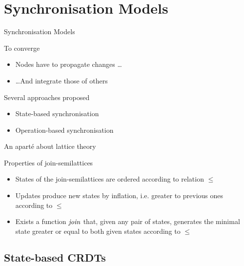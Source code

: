 \section{Synchronisation Models}

\begin{frame}{Synchronisation Models}
    \begin{block}{To converge}
        \begin{itemize}
            \item Nodes have to propagate changes \dots
            \item \dots And integrate those of others
        \end{itemize}
    \end{block}

    \begin{block}{Several approaches proposed}
        \begin{itemize}
            \item State-based synchronisation
            \item Operation-based synchronisation
        \end{itemize}
    \end{block}
\end{frame}


\begin{frame}{An aparté about lattice theory}

    \begin{block}{Properties of join-semilattices}
        \begin{itemize}
            \item States of the join-semilattices are ordered according to relation $\leq$
            \item Updates produce new states by inflation, i.e. greater to previous ones according to $\leq$
            \item Exists a function $\mathit{join}$ that, given any pair of states, generates the minimal state greater or equal to both given states according to $\leq$
        \end{itemize}
    \end{block}
\end{frame}

\subsection{State-based CRDTs}

